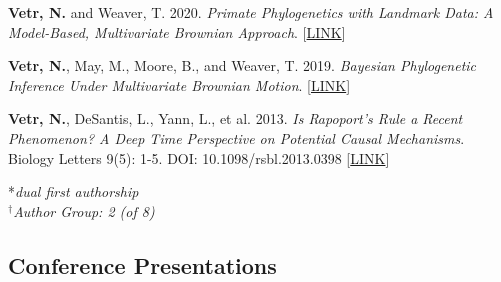 \documentclass[12pt]{article}
\begin{document}
\begin{enumerate}[label={[\arabic*]}]
\item \textbf{Vetr, N.} and Weaver, T. 2020.  \emph{Primate Phylogenetics with Landmark Data: A Model-Based, Multivariate Brownian Approach}. [\href{https://github.com/NikVetr/papers/blob/main/jhe-manuscript/mvBM_manuscript_JHE.pdf}{LINK}]

\item \textbf{Vetr, N.}, May, M., Moore, B., and Weaver, T. 2019.  \emph{Bayesian Phylogenetic Inference Under Multivariate Brownian Motion}. [\href{https://github.com/NikVetr/papers/blob/main/sysbio-manuscript\%20/mvBM_manuscript_sysbio.pdf}{LINK}]

\item \textbf{Vetr, N.}, DeSantis, L., Yann, L., et al. 2013.  \emph{Is Rapoport’s Rule a Recent Phenomenon? A Deep Time Perspective on Potential Causal Mechanisms}. Biology Letters 9(5): 1-5. DOI: 10.1098/rsbl.2013.0398 [\href{https://royalsocietypublishing.org/doi/10.1098/rsbl.2013.0398}{LINK}]

*\textit{dual first authorship}\\
$^{\dag}$\textit{Author Group: 2 (of 8)}

\end{enumerate}

\subsection{Conference Presentations}
\end{document}
